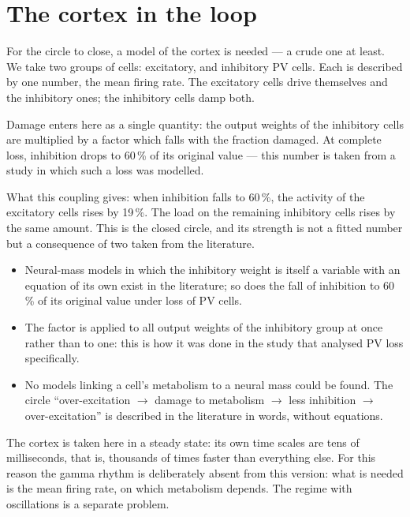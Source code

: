 \section{The cortex in the loop}\label{sec:loop}
For the circle to close, a model of the cortex is needed --- a crude one at least. We take two groups of cells: excitatory, and inhibitory PV cells. Each is described by one number, the mean firing rate. The excitatory cells drive themselves and the inhibitory ones; the inhibitory cells damp both.

Damage enters here as a single quantity: the output weights of the inhibitory cells are multiplied by a factor which falls with the fraction damaged. At complete loss, inhibition drops to 60\,\% of its original value --- this number is taken from a study in which such a loss was modelled.

What this coupling gives: when inhibition falls to 60\,\%, the activity of the excitatory cells rises by 19\,\%. The load on the remaining inhibitory cells rises by the same amount. This is the closed circle, and its strength is not a fitted number but a consequence of two taken from the literature.

\facts
\begin{itemize}
\item Neural-mass models in which the inhibitory weight is itself a variable with an equation of its own exist in the literature; so does the fall of inhibition to 60\,\% of its original value under loss of PV cells.\tP
\item The factor is applied to all output weights of the inhibitory group at once rather than to one: this is how it was done in the study that analysed PV loss specifically.\tP
\item No models linking a cell's metabolism to a neural mass could be found. The circle ``over-excitation $\to$ damage to metabolism $\to$ less inhibition $\to$ over-excitation'' is described in the literature in words, without equations.\tS
\end{itemize}

\begin{note}
The cortex is taken here in a steady state: its own time scales are tens of milliseconds, that is, thousands of times faster than everything else. For this reason the gamma rhythm is deliberately absent from this version: what is needed is the mean firing rate, on which metabolism depends. The regime with oscillations is a separate problem.
\end{note}
